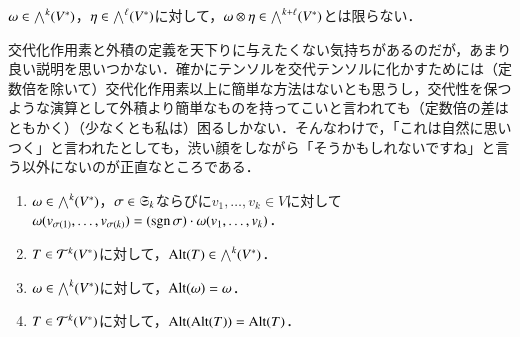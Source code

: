 \begin{que}
$\omega \in \bigwedge^k(V^*)$，$\eta \in \bigwedge^\ell(V^*)$に対して，$\omega \otimes \eta \in \bigwedge^{k + \ell}(V^*)$とは限らない．
\end{que}

\begin{dig}
交代化作用素と外積の定義を天下りに与えたくない気持ちがあるのだが，あまり良い説明を思いつかない．確かにテンソルを交代テンソルに化かすためには（定数倍を除いて）交代化作用素以上に簡単な方法はないとも思うし，交代性を保つような演算として外積より簡単なものを持ってこいと言われても（定数倍の差はともかく）（少なくとも私は）困るしかない．そんなわけで，「これは自然に思いつく」と言われたとしても，渋い顔をしながら「そうかもしれないですね」と言う以外にないのが正直なところである．
\end{dig}

\begin{prop}[交代化作用素の基本性質]\label{交代化作用素の基本性質}
\leavevmode
\begin{enumerate}
\item $\omega \in \bigwedge^k(V^*)$，$\sigma \in \mathfrak{S}_k$ならびに$v_1, \dots, v_k \in V$に対して$\omega(v_{\sigma(1)},\dots,v_{\sigma(k)}) = (\operatorname{sgn} \sigma)\cdot \omega(v_1, \dots, v_k)$．
\item $T \in \mathcal{T}^k(V^*)$に対して，$\operatorname{Alt}(T) \in \bigwedge^k(V^*)$．
\item $\omega \in \bigwedge^k(V^*)$に対して，$\operatorname{Alt}(\omega) = \omega$．
\item $T \in \mathcal{T}^k(V^*)$に対して，$\operatorname{Alt}(\operatorname{Alt}(T)) = \operatorname{Alt}(T)$．
\end{enumerate}
\end{prop}

